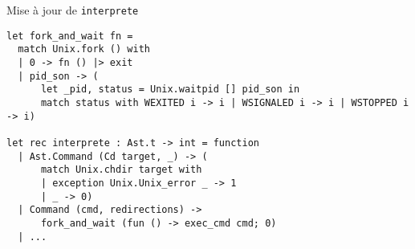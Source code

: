 \begin{frame}[fragile]{Mise à jour de \texttt{interprete}}

\begin{lstlisting}
let fork_and_wait fn =
  match Unix.fork () with
  | 0 -> fn () |> exit
  | pid_son -> (
      let _pid, status = Unix.waitpid [] pid_son in
      match status with WEXITED i -> i | WSIGNALED i -> i | WSTOPPED i -> i)

let rec interprete : Ast.t -> int = function
  | Ast.Command (Cd target, _) -> (
      match Unix.chdir target with 
      | exception Unix.Unix_error _ -> 1 
      | _ -> 0)
  | Command (cmd, redirections) ->
      fork_and_wait (fun () -> exec_cmd cmd; 0)
  | ...
\end{lstlisting}
\end{frame}